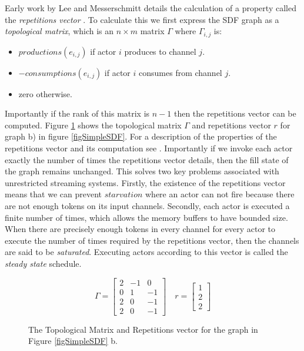Early work by Lee and Messerschmitt details the calculation of a property called the {\em repetitions vector} \cite{lee87}.
To calculate this we first express the SDF graph as a {\em topological matrix}, which is an $n \times m$ matrix $\Gamma$ where $\Gamma_{i,j}$ is:
\begin{itemize}
	\item $productions(e_{i,j})$ if actor $i$ produces to channel $j$.
	\item $-consumptions(e_{i,j})$ if actor $i$ consumes from channel $j$.
	\item zero otherwise.
\end{itemize}
\noindent Importantly if the rank of this matrix is $n-1$ then the repetitions vector can be computed.
Figure \ref{figSimpleTop} shows the topological matrix $\Gamma$ and repetitions vector $r$ for graph b) in figure \ref{figSimpleSDF}.
For a description of the properties of the repetitions vector and its computation see \cite{sdfBook}.
Importantly if we invoke each actor exactly the number of times the repetitions vector details, then the fill state of the graph remains unchanged.
This solves two key problems associated with unrestricted streaming systems.
Firstly, the existence of the repetitions vector means that we can prevent $starvation$ where an actor can not fire because there are not enough tokens on its input channels.
Secondly, each actor is executed a finite number of times, which allows the memory buffers to have bounded size.
When there are precisely enough tokens in every channel for every actor to execute the number of times required by the repetitions vector, then the channels are said to be {\em saturated}.
Executing actors according to this vector is called the {\em steady state} schedule.

\begin{figure}
\begin{center}
\[
	\Gamma = \begin{bmatrix}
	2 & -1 & 0 \\
	0 & 1 & -1 \\
	2 & 0 & -1 \\
	2 & 0 & -1
	\end{bmatrix}
	\quad
	r = \begin{bmatrix}
		1 \\
		2 \\
		2
	\end{bmatrix}
\]
\caption{The Topological Matrix and Repetitions vector for the graph in Figure \ref{figSimpleSDF} b.}
\label{figSimpleTop}
\end{center}
\end{figure}

